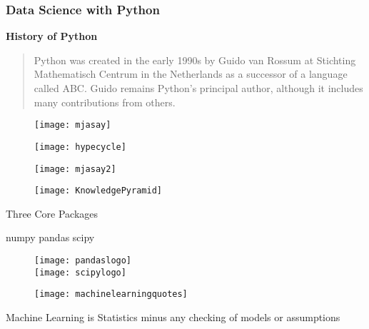 \documentclass{beamer}
\begin{document}
 
  \frametitle{Data Science with Python}
  
 \textbf{History of Python}
 \begin{quote}
  Python was created in the early 1990s by Guido van Rossum at Stichting Mathematisch Centrum in the Netherlands as a successor of a language called ABC. Guido remains Python’s principal author, although it includes many contributions from others.
 \end{quote}
 
 
 \begin{figure}
\centering
\texttt{[image: mjasay]}

\end{figure}

 
 
\begin{figure}
\centering
\texttt{[image: hypecycle]}
\end{figure}
 
 
 \begin{figure}
\centering
\texttt{[image: mjasay2]}
\end{figure}

 
 
 \begin{figure}
\centering
\texttt{[image: KnowledgePyramid]}
\end{figure}
 







%
 
 \huge
 Three Core Packages
 \begin{enumerate}
   numpy
   pandas
   scipy
 \end{enumerate}
 \begin{figure}
\centering
\texttt{[image: pandaslogo]}\\
\texttt{[image: scipylogo]}

\end{figure}

 



 
 \begin{figure}
  \centering
  \texttt{[image: machinelearningquotes]}
 \end{figure}
   Machine Learning is Statistics minus any checking of models or assumptions
 
\end{document}
